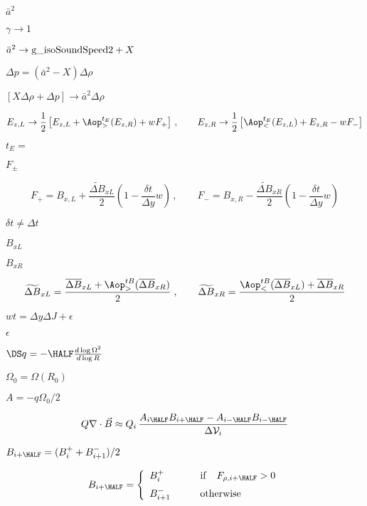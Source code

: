\documentclass{article}
\begin{document}
$ \bar{a}^2 $
\pagebreak

$ \gamma \to 1$
\pagebreak

$\bar{a}^2 \to {\rm g\_isoSoundSpeed2} + X$
\pagebreak

$ \Delta p = (\bar{a}^2 - X)\Delta\rho$
\pagebreak

$ [X\Delta\rho + \Delta p] \to \bar{a}^2\Delta\rho $
\pagebreak

\[ 
   E_{z,L} \to \frac{1}{2}\left[E_{z,L} + \Aop^{t_E}_{>}(E_{z,R})
         + wF_{+}\right]
 \,,\qquad
   E_{z,R} \to \frac{1}{2}\left[\Aop^{t_E}_<(E_{z,L}) + E_{z,R}
         - wF_-\right]
\]
\pagebreak

$t_E =$
\pagebreak

$F_{\pm}$
\pagebreak

\[
   F_{+} = B_{x,L} + \frac{\widetilde{\Delta B}_{xL}}{2}
           \left(1 - \frac{\delta t}{\Delta y}w\right)
 \,,\qquad
   F_{-} = B_{x,R} - \frac{\widetilde{\Delta B}_{xR}}{2}
           \left(1 - \frac{\delta t}{\Delta y}w\right)
\]
\pagebreak

$ \delta t\ne \Delta t$
\pagebreak

$B_{xL}$
\pagebreak

$B_{xR}$
\pagebreak

\[
  \widetilde{\Delta B}_{xL} = 
  \frac{                \overline{\Delta B}_{xL} 
          + \Aop^{tB}_{>}(\overline{\Delta B}_{xR})}{2}
   \;,\qquad
  \widetilde{\Delta B}_{xR} = 
  \frac{ \Aop^{tB}_{<}(\overline{\Delta B}_{xL}) 
                     + \overline{\Delta B}_{xR}}{2}         
\]
\pagebreak

$ wt = 
 \Delta y\Delta J + \epsilon $
\pagebreak

$ \epsilon $
\pagebreak

$\DS q = -\HALF\frac{d\log
            \Omega^2}{d\log R} $
\pagebreak

$ \Omega_0 = 
                \Omega(R_0)$
\pagebreak

$ A = -q\Omega_0/2 $
\pagebreak

\[
  Q\nabla\cdot\vec{B} \approx Q_i\, 
  \frac{A_{i\HALF}B_{i+\HALF} - A_{i-\HALF}B_{i-\HALF}}{\Delta{\cal V}_i}
\]
\pagebreak

$ B_{i+\HALF} = (B^+_i + B^-_{i+1})/2 $
\pagebreak

\[
   B_{i+\HALF} = \left\{\begin{array}{ll}
    B^+_i      & \qquad{\rm if}\quad F_{\rho,i+\HALF} > 0\\ \noalign{\medskip}
    B^-_{i+1}  & \qquad{\rm otherwise}
    \end{array}\right.
\]
\pagebreak
\end{document}
